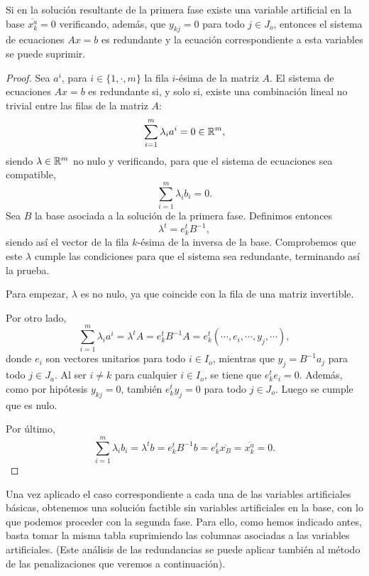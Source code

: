 \begin{lem}
	Si en la solución resultante de la primera fase existe una variable artificial en la base $\overline{x^a_k}=0$ verificando, además, que $y_{kj}=0$ para todo $j\in J_o$, entonces el sistema de ecuaciones $Ax=b$ es redundante y la ecuación correspondiente a esta variables se puede suprimir.
\end{lem}
\begin{proof}
	Sea $a^i$, para $i\in\{1,\cdot,m\}$ la fila $i$-ésima de la matriz $A$. El sistema de ecuaciones $Ax=b$ es redundante si, y solo si, existe una combinación lineal no trivial entre las filas de la matriz $A$:
	\begin{equation*}
		\sum_{i=1}^m\lambda_ia^i=0\in\mathbb{R}^m,
	\end{equation*}
	siendo $\lambda\in\mathbb{R}^m$ no nulo y verificando, para que el sistema de ecuaciones sea compatible,
	\begin{equation*}
		\sum_{i=1}^m\lambda_ib_i=0.
	\end{equation*}
	Sea $B$ la base asociada a la solución de la primera fase. Definimos entonces
	\begin{equation*}
		\lambda^t=e_k^tB^{-1},
	\end{equation*}
	siendo así el vector de la fila $k$-ésima de la inversa de la base. Comprobemos que este $\lambda$ cumple las condiciones para que el sistema sea redundante, terminando así la prueba.
	
	Para empezar, $\lambda$ es no nulo, ya que coincide con la fila de una matriz invertible.
	
	Por otro lado, 
	\begin{equation*}
		\sum_{i=1}^m\lambda_ia^i=\lambda^t A=e^t_kB^{-1}A=e^t_k(\cdots,e_i,\cdots,y_j,\cdots),
	\end{equation*}
	donde $e_i$ son vectores unitarios para todo $i\in I_o$, mientras que $y_j=B^{-1}a_j$ para todo $j\in J_a$. Al ser $i\not=k$ para cualquier $i\in I_o$, se tiene que $e^t_ke_i=0$. Además, como por hipótesis $y_{kj}=0$, también $e^t_ky_j=0$ para todo $j\in J_o$. Luego se cumple que es nulo.
	
	Por último, 
	\begin{equation*}
		\sum_{i=1}^m\lambda_ib_i=\lambda^t b=e^t_kB^{-1}b=e^t_k\overline{x_B}=\overline{x_k^a}=0.
	\end{equation*}
\end{proof}
Una vez aplicado el caso correspondiente a cada una de las variables artificiales básicas, obtenemos una solución factible sin variables artificiales en la base, con lo que podemos proceder con la segunda fase. Para ello, como hemos indicado antes, basta tomar la misma tabla suprimiendo las columnas asociadas a las variables artificiales. (Este análisis de las redundancias se puede aplicar también al método de las penalizaciones que veremos a continuación).

